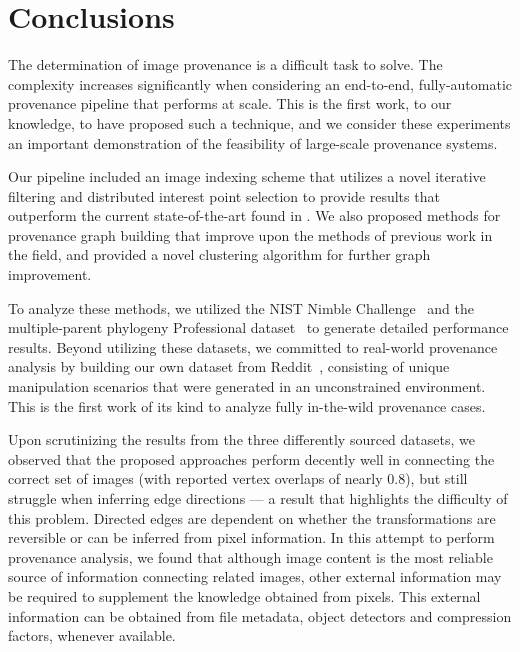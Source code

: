 \section{Conclusions}
\label{sec:conc}

The determination of image provenance is a difficult task to solve. The complexity increases significantly when considering an end-to-end, fully-automatic provenance pipeline that performs at scale. This is the first work, to our knowledge, to have proposed such a technique, and we consider these experiments an important demonstration of the feasibility of large-scale provenance systems.

Our pipeline included an image indexing scheme that utilizes a novel iterative filtering and distributed interest point selection to provide results that outperform the current state-of-the-art found in \cite{pinto2017filtering}. %
We also proposed methods for provenance graph building that improve upon the methods of previous work in the field, and  provided a novel clustering algorithm for further graph improvement.

To analyze these methods, we utilized the NIST Nimble Challenge~\cite{Nimble_2017} and the multiple-parent phylogeny Professional dataset~\cite{Oliveira_2016} to generate detailed performance results. Beyond utilizing these datasets, we committed to real-world provenance analysis by building our own dataset from Reddit~\cite{reddit2017photoshopbattles}, consisting of unique manipulation scenarios that were generated in an unconstrained environment. This is the first work of its kind to analyze fully in-the-wild provenance cases. 

Upon scrutinizing the results from the three differently sourced datasets, we observed that the proposed approaches perform decently well in connecting the correct set of images (with reported vertex overlaps of nearly 0.8), but still struggle when inferring edge directions --- a result that highlights the difficulty of this problem. Directed  edges are dependent on whether the transformations are reversible or can be inferred from pixel information. In this attempt to perform provenance analysis, we found that although image content is the most reliable source of information connecting related images, other external information may be required to supplement the knowledge obtained from pixels. This external information can be obtained from file metadata, object detectors and compression factors, whenever available.
 
